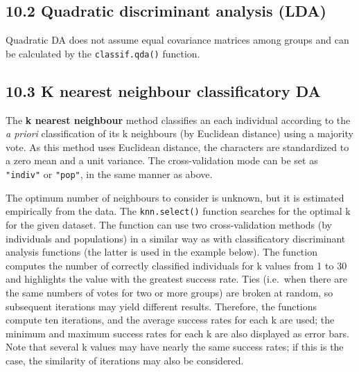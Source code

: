 \documentclass[
]{article}
\newenvironment{Shaded}{\begin{snugshade}}{\end{snugshade}}
\newcommand{\CommentTok}[1]{\textcolor[rgb]{0.56,0.35,0.01}{\textit{#1}}}
\newcommand{\DataTypeTok}[1]{\textcolor[rgb]{0.13,0.29,0.53}{#1}}
\newcommand{\KeywordTok}[1]{\textcolor[rgb]{0.13,0.29,0.53}{\textbf{#1}}}
\newcommand{\NormalTok}[1]{#1}
\newcommand{\StringTok}[1]{\textcolor[rgb]{0.31,0.60,0.02}{#1}}
\begin{document}
\hypertarget{quadratic-discriminant-analysis-lda}{%
\subsection{10.2 Quadratic discriminant analysis
(LDA)}\label{quadratic-discriminant-analysis-lda}}

Quadratic DA does not assume equal covariance matrices among groups and
can be calculated by the \texttt{classif.qda()} function.

\begin{Shaded}
\end{Shaded}

\hypertarget{k-nearest-neighbour-classificatory-da}{%
\subsection{10.3 K nearest neighbour classificatory
DA}\label{k-nearest-neighbour-classificatory-da}}

The \textbf{k nearest neighbour} method classifies an each individual
according to the \emph{a priori} classification of its k neighbours (by
Euclidean distance) using a majority vote. As this method uses Euclidean
distance, the characters are standardized to a zero mean and a unit
variance. The cross-validation mode can be set as \texttt{"indiv"} or
\texttt{"pop"}, in the same manner as above.

The optimum number of neighbours to consider is unknown, but it is
estimated empirically from the data. The \texttt{knn.select()} function
searches for the optimal k for the given dataset. The function can use
two cross-validation methods (by individuals and populations) in a
similar way as with classificatory discriminant analysis functions (the
latter is used in the example below). The function computes the number
of correctly classified individuals for k values from 1 to 30 and
highlights the value with the greatest success rate. Ties (i.e.~when
there are the same numbers of votes for two or more groups) are broken
at random, so subsequent iterations may yield different results.
Therefore, the functions compute ten iterations, and the average success
rates for each k are used; the minimum and maximum success rates for
each k are also displayed as error bars. Note that several k values may
have nearly the same success rates; if this is the case, the similarity
of iterations may also be considered.
\end{document}
